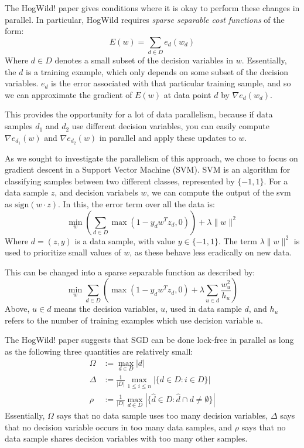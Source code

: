 \documentclass{article}
\newcommand{\grad}{\nabla}
\newcommand{\sign}{{\text{sign}}}
\begin{document}
The HogWild! paper gives conditions where it is okay to perform these
changes in parallel.
In particular, HogWild requires \emph{sparse separable cost functions}
of the form:
\[
    E(w) = \sum\limits_{d \in D} e_d(w_d)
\]
Where $d \in D$ denotes a small subset of the decision variables in $w$.
Essentially, the $d$ is a training example, which only depends on some
subset of the decision variables.
$e_d$ is the error associated with that particular training sample,
and so we can approximate the gradient of $E(w)$ at data point $d$
by $\grad e_d(w_d)$.

This provides the opportunity for a lot of data parallelism,
because if data samples $d_1$ and $d_2$ use different decision variables,
you can easily compute $\grad e_{d_1}(w)$ and $\grad e_{d_2}(w)$ in
parallel and apply these updates to $w$.

As we sought to investigate the parallelism of this approach, we chose
to focus on gradient descent in a Support Vector Machine (SVM).
SVM is an algorithm for classifying samples between two different
classes, represented by $\{-1, 1\}$.
For a data sample $z$, and decision variabels $w$, we can compute the
output of the svm as $\sign(w \cdot z)$.
In this, the error term over all the data is:
\[
    \min\limits_w \left(\sum\limits_{d\in D} \max(1-y_d w^T z_d, 0)\right)
                  + \lambda \|w\|^2
\]
Where $d = (z,y)$ is a data sample, with value $y \in \{-1, 1\}$.
The term $\lambda \|w\|^2$ is used to prioritize small values of $w$,
as these behave less eradically on new data.

This can be changed into a sparse separable function as described by:
\[
    \min\limits_w \sum\limits_{d \in D}
                  \left(\max(1 - y_d w^T z_d, 0) +
                        \lambda \sum\limits_{u\in d} \frac{w_u^2}{h_u}
                  \right)
\]
Above, $u\in d$ means the decision variables, $u$, used in data sample $d$,
and $h_u$ refers to the number of training examples which use
decision variable $u$.

The HogWild! paper suggests that SGD can be done lock-free in parallel
as long as the following three quantities are relatively small:
\begin{align*}
    \Omega &:= \max\limits_{d\in D} |d| \\
    \Delta &:= \frac{1}{|D|}
               \max\limits_{1 \leq i \leq n}|\{d \in D : i \in D\}| \\
    \rho &:= \frac{1}{|D|}
             \max\limits_{d\in D}
             |\{ \hat d \in D : \hat d \cap d \neq \emptyset\}|
\end{align*}
Essentially, $\Omega$ says that no data sample uses too many decision
variables,
$\Delta$ says that no decision variable occurs in too many data samples,
and $\rho$ says that no data sample shares decision variables with too many
other samples.
\end{document}
